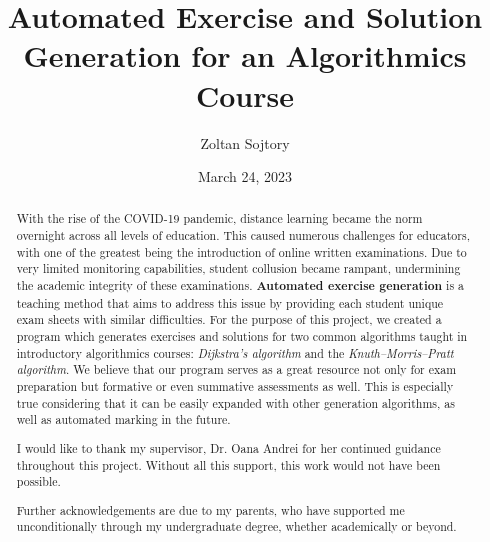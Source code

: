 \documentclass{l4proj}
\begin{document}
\title{Automated Exercise and Solution Generation for an Algorithmics Course}
\author{Zoltan Sojtory}
\date{March 24, 2023}

\maketitle

\begin{abstract}
	With the rise of the COVID-19 pandemic, distance learning became the norm overnight across all levels of education. This caused numerous challenges for educators, with one of the greatest being the introduction of online written examinations. Due to very limited monitoring capabilities, student collusion became rampant, undermining the academic integrity of these examinations. \textbf{Automated exercise generation} is a teaching method that aims to address this issue by providing each student unique exam sheets with similar difficulties. For the purpose of this project, we created a program which generates exercises and solutions for two common algorithms taught in introductory algorithmics courses: \textit{Dijkstra's algorithm} and the \textit{Knuth–Morris–Pratt algorithm}. We believe that our program serves as a great resource not only for exam preparation but formative or even summative assessments as well. This is especially true considering that it can be easily expanded with other generation algorithms, as well as automated marking in the future.
\end{abstract}


\renewcommand{\abstractname}{Acknowledgements}
\begin{abstract}
I would like to thank my supervisor, Dr. Oana Andrei for her continued guidance throughout this project. Without all this support, this work would not have been possible.

Further acknowledgements are due to my parents, who have supported me unconditionally through my undergraduate degree, whether academically or beyond.
\end{abstract}

%
%
%
\educationalconsent
\end{document}

